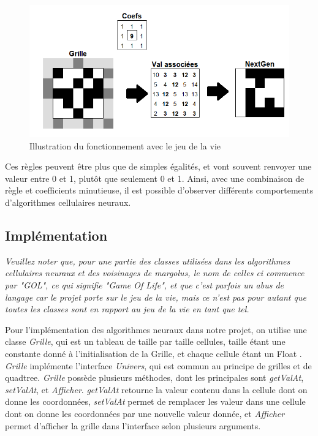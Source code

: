 \begin{figure}[H]
        \center
        \includegraphics[scale=0.6]{images/imgAlgoNeural/IllustrationGOL.png}
        \caption{Illustration du fonctionnement avec le jeu de la vie}
\end{figure}
 
\par Ces règles peuvent être plus que de simples égalités, et vont souvent renvoyer une valeur entre 0 et 1, plutôt que seulement 0 et 1. Ainsi, avec une combinaison de règle et coefficients minutieuse, il est possible d'observer différents comportements d'algorithmes cellulaires neuraux.

\subsection{Implémentation}

\par \textit{Veuillez noter que, pour une partie des classes utilisées dans les algorithmes cellulaires neuraux et des voisinages de margolus, le nom de celles ci commence par "GOL", ce qui signifie "Game Of Life", et que c'est parfois un abus de langage car le projet porte sur le jeu de la vie, mais ce n'est pas pour autant que toutes les classes sont en rapport au jeu de la vie en tant que tel.}

\par Pour l'implémentation des algorithmes neuraux dans notre projet, on utilise une classe \textit{Grille}, qui est un tableau de taille par taille cellules, taille étant une constante donné à l'initialisation de la Grille, et chaque cellule étant un Float . \textit{Grille} implémente l'interface \textit{Univers}, qui est commun au principe de grilles et de quadtree. \textit{Grille} possède plusieurs méthodes, dont les principales sont \textit{getValAt}, \textit{setValAt}, et \textit{Afficher}. \textit{getValAt} retourne la valeur contenu dans la cellule dont on donne les coordonnées, \textit{setValAt} permet de remplacer les valeur dans une cellule dont on donne les coordonnées par une nouvelle valeur donnée, et \textit{Afficher} permet d'afficher la grille dans l'interface selon plusieurs arguments.

